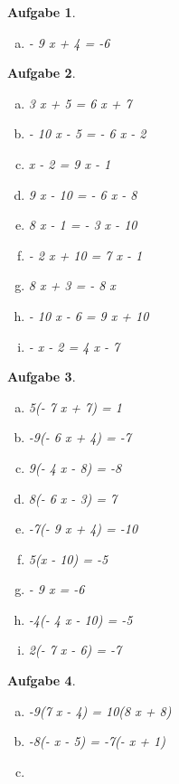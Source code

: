 \documentclass[12pt]{article}
\theoremstyle{note}
\newtheorem{aufgabe}{Aufgabe}
\begin{document}
\begin{flushleft}
\begin{aufgabe}
\begin{multicols}{3}
\begin{enumerate}[a)]
\item 
- 9 x + 4 = -6
\end{enumerate} 
\end{multicols} 
\end{aufgabe} 
\begin{aufgabe} ~ \\ 
\begin{multicols}{3} 
\begin{enumerate}[a)] 
\item 
3 x + 5 = 6 x + 7
\item 
- 10 x - 5 = - 6 x - 2
\item 
x - 2 = 9 x - 1
\item 
9 x - 10 = - 6 x - 8
\item 
8 x - 1 = - 3 x - 10
\item 
- 2 x + 10 = 7 x - 1
\item 
8 x + 3 = - 8 x
\item 
- 10 x - 6 = 9 x + 10
\item 
- x - 2 = 4 x - 7
\end{enumerate} 
\end{multicols} 
\end{aufgabe} 
\begin{aufgabe} ~ \\ 
\begin{multicols}{3} 
\begin{enumerate}[a)] 
\item 
5(- 7 x + 7) = 1
\item 
-9(- 6 x + 4) = -7
\item 
9(- 4 x - 8) = -8
\item 
8(- 6 x - 3) = 7
\item 
-7(- 9 x + 4) = -10
\item 
5(x - 10) = -5
\item 
- 9 x = -6
\item 
-4(- 4 x - 10) = -5
\item 
2(- 7 x - 6) = -7
\end{enumerate} 
\end{multicols} 
\end{aufgabe} 
\begin{aufgabe} ~ \\ 
\begin{multicols}{2} 
\begin{enumerate}[a)] 
\item 
-9(7 x - 4) = 10(8 x + 8)
\item 
-8(- x - 5) = -7(- x + 1)
\item 

\end{enumerate}
\end{multicols}
\end{aufgabe}
\end{flushleft}
\end{document}

